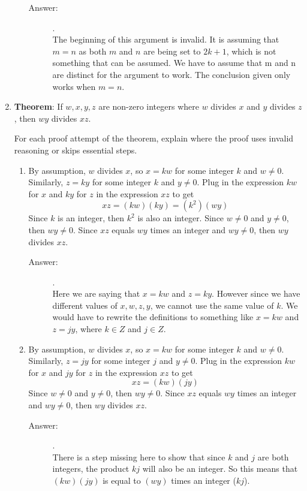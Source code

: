 \documentclass[12pt, oneside]{article}
\begin{document}
\begin{enumerate}
\begin{enumerate}
    \begin{description}
        \item[Answer:].\\
        The beginning of this argument is invalid. It is assuming that $m=n$ as both $m$ and $n$ are being set to $2k+1$, which is not something that can be assumed. We have to assume that m and n are distinct for the argument to work. The conclusion given only works when $m=n$.
    \end{description}

\end{enumerate}

\quad
\item \textbf{Theorem}: If $w, x, y, z$ are non-zero integers where $w$ divides $x$ and $y$ divides $z$, then $wy$ divides $xz$.

For each proof attempt of the theorem, explain where the proof uses invalid reasoning or skips essential steps.
\begin{enumerate}
    \item By assumption, $w$ divides $x$, so $x = kw$ for some integer $k$ and $w \neq 0$. Similarly, $z = ky$ for some integer $k$ and $y \neq 0$. Plug in the expression $kw$ for $x$ and $ky$ for $z$ in the expression $xz$ to get
    \[xz=(kw)(ky)=(k^2)(wy)\]
    Since $k$ is an integer, then $k^2$ is also an integer. Since $w \neq 0$ and $y \neq 0$, then $wy \neq 0$. Since $xz$ equals $wy$ times an integer and $wy \neq 0$, then $wy$ divides $xz$.
    
    \begin{description}
        \item[Answer:].\\
        Here we are saying that $x=kw$ and $z=ky$. However since we have different values of $x,w,z,y$, we cannot use the same value of $k$. We would have to rewrite the definitions to something like $x=kw$ and $z=jy$, where $k \in Z$ and $j \in Z$.
    \end{description}

    \item By assumption, $w$ divides $x$, so $x = kw$ for some integer $k$ and $w \neq 0$. Similarly, $z = jy$ for some integer $j$ and $y \neq 0$. Plug in the expression $kw$ for $x$ and $jy$ for $z$ in the expression $xz$ to get
    \[xz=(kw)(jy)\]
    Since $w \neq 0$ and $y \neq 0$, then $wy \neq 0$. Since $xz$ equals $wy$ times an integer and $wy \neq 0$, then $wy$ divides $xz$.
    
    \begin{description}
        \item[Answer:].\\
        There is a step missing here to show that since $k$ and $j$ are both integers, the product $kj$ will also be an integer. So this means that $(kw)(jy)$ is equal to $(wy)$ times an integer ($kj$).
    \end{description}


\end{enumerate}
\end{enumerate}
\end{document}
